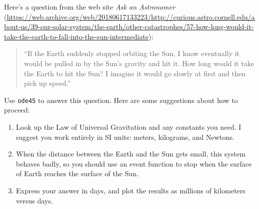 \begin{ex}
\label{earth}


Here's a question from the web site {\em Ask an Astronomer} (\url{https://web.archive.org/web/20180617133223/http://curious.astro.cornell.edu/about-us/39-our-solar-system/the-earth/other-catastrophes/57-how-long-would-it-take-the-earth-to-fall-into-the-sun-intermediate}):

\begin{quote}
``If the Earth suddenly stopped orbiting the Sun, I know eventually it would be pulled in by the Sun's gravity and hit it. How long would it take the Earth to hit the Sun? I imagine it would go slowly at first and then pick up speed.''
\end{quote}

Use {\tt ode45} to answer this question.  Here are some suggestions about how to proceed:

\begin{enumerate}

\item Look up the Law of Universal Gravitation and any constants you need. I suggest you work entirely in SI units: meters, kilograms, and Newtons.

\item When the distance between the Earth and the Sun gets small, this system behaves badly, so you should use an event function to stop when the surface of Earth reaches the surface of the Sun.

\item Express your answer in days, and plot the results as millions of kilometers versus days.

\end{enumerate}

\end{ex}


